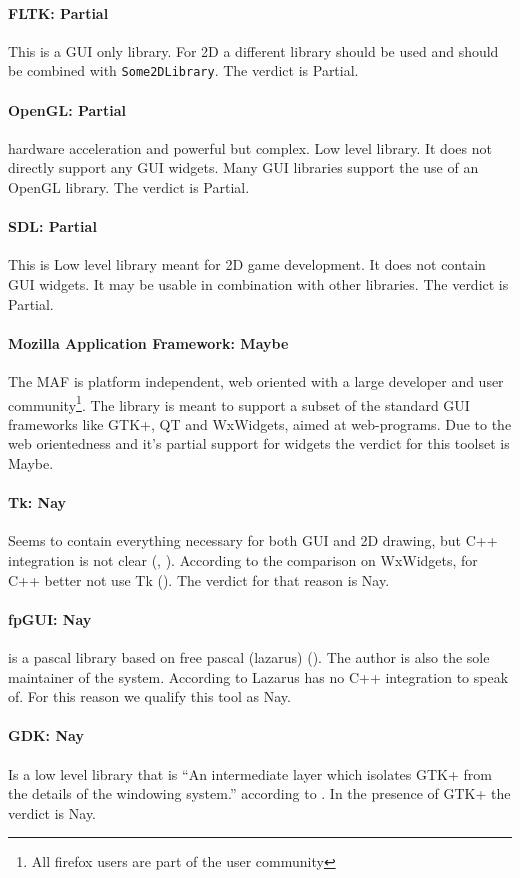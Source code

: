 \paragraph{FLTK: Partial} This is a GUI only library. For 2D a different library
should be used and should be combined with \verb!Some2DLibrary!. The verdict is
Partial.

\paragraph{OpenGL: Partial} hardware acceleration and powerful but complex. Low
level library. It does not directly support any GUI widgets. Many GUI libraries
support the use of an OpenGL library. The verdict is Partial.

\paragraph{SDL: Partial} This is Low level library meant for 2D game
development. It does not contain GUI widgets. It may be usable in combination
with other libraries. The verdict is Partial.

\paragraph{Mozilla Application Framework: Maybe} The MAF is platform
independent, web oriented with a large developer and user
community\footnote{All firefox users are part of the user community}.  The
library is meant to support a subset of the standard GUI frameworks like GTK+,
QT and WxWidgets, aimed at web-programs. Due to the web orientedness and it's
partial support for widgets the verdict for this toolset is Maybe.

\paragraph{Tk: Nay} Seems to contain everything necessary for both GUI and 2D
drawing, but C++ integration is not clear (\cite{wiki:tk}, \cite{tcltk:tk}).
According to the comparison on WxWidgets, for C++ better not use Tk
(\cite{wxwidget:comparison}).  The verdict for that reason is Nay.

\paragraph{fpGUI: Nay} is a pascal library based on free pascal (lazarus)
(\cite{Geldenhuys:fpgui}).  The author is also the sole maintainer of the
system. According to \cite{wxwidget:comparison} Lazarus has no C++ integration
to speak of. For this reason we qualify this tool as Nay.

\paragraph{GDK: Nay} Is a low level library that is ``An intermediate layer
which isolates GTK+ from the details of the windowing system.'' according to
\cite{gnome:gdk3}. In the presence of GTK+ the verdict is Nay.

